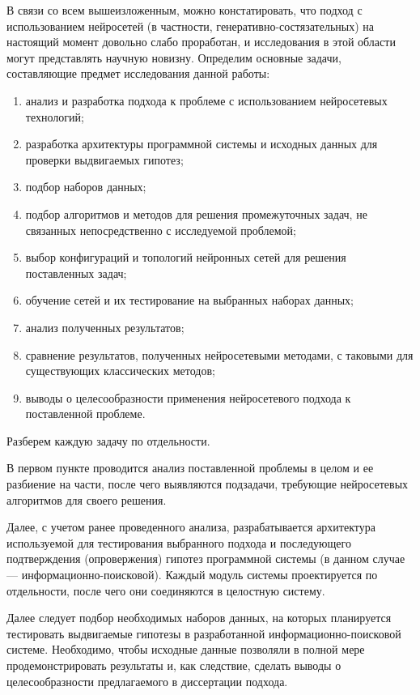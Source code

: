 В связи со всем вышеизложенным, можно констатировать, что подход с использованием нейросетей
(в частности, генеративно-состязательных) на настоящий момент довольно слабо проработан,
и исследования в этой области могут представлять научную новизну. Определим основные
задачи, составляющие предмет исследования данной работы:
\begin{enumerate}[1)]
    \item анализ и разработка подхода к проблеме с использованием нейросетевых технологий;
    \item разработка архитектуры программной системы и исходных данных для проверки
          выдвигаемых гипотез;
    \item подбор наборов данных;
    \item подбор алгоритмов и методов для решения промежуточных задач, не связанных непосредственно
          с исследуемой проблемой;
    \item выбор конфигураций и топологий нейронных сетей для решения поставленных задач;
    \item обучение сетей и их тестирование на выбранных наборах данных;
    \item анализ полученных результатов;
    \item сравнение результатов, полученных нейросетевыми методами, с таковыми для
          существующих классических методов;
    \item выводы о целесообразности применения нейросетевого подхода к поставленной проблеме.
\end{enumerate}
Разберем каждую задачу по отдельности.

В первом пункте проводится анализ поставленной проблемы в целом и ее разбиение на части, после
чего выявляются подзадачи, требующие нейросетевых алгоритмов для своего решения.

Далее, с учетом ранее проведенного анализа, разрабатывается архитектура используемой для
тестирования выбранного подхода и последующего подтверждения (опровержения) гипотез программной системы
(в данном случае --- информационно-поисковой). Каждый модуль системы проектируется по отдельности,
после чего они соединяются в целостную систему.

Далее следует подбор необходимых наборов данных, на которых планируется тестировать выдвигаемые гипотезы
в разработанной информационно-поисковой системе. Необходимо, чтобы исходные данные позволяли в полной
мере продемонстрировать результаты и, как следствие, сделать выводы о целесообразности предлагаемого
в диссертации подхода.

